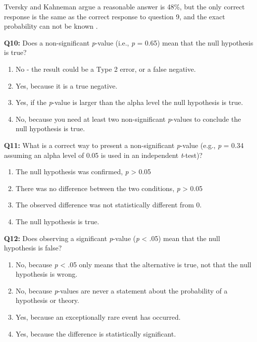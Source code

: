 \documentclass[
  oneside]{book}
\providecommand{\tightlist}{%
  \setlength{\itemsep}{0pt}\setlength{\parskip}{0pt}}
\begin{document}
Tversky and Kahneman argue a reasonable answer is 48\%, but the only correct response is the same as the correct response to question 9, and the exact probability can not be known \citep{miller_what_2009}.

\textbf{Q10:} Does a non-significant \emph{p}-value (i.e., \emph{p} = 0.65) mean that the null hypothesis is true?

\begin{enumerate}
\def\labelenumi{\Alph{enumi})}
\tightlist
\item
  No - the result could be a Type 2 error, or a false negative.
\item
  Yes, because it is a true negative.
\item
  Yes, if the \emph{p}-value is larger than the alpha level the null hypothesis is true.
\item
  No, because you need at least two non-significant \emph{p}-values to conclude the null hypothesis is true.
\end{enumerate}

\textbf{Q11:} What is a correct way to present a non-significant \emph{p}-value (e.g., \emph{p} = 0.34 assuming an alpha level of 0.05 is used in an independent \emph{t}-test)?

\begin{enumerate}
\def\labelenumi{\Alph{enumi})}
\tightlist
\item
  The null hypothesis was confirmed, \emph{p} \textgreater{} 0.05
\item
  There was no difference between the two conditions, \emph{p} \textgreater{} 0.05
\item
  The observed difference was not statistically different from 0.
\item
  The null hypothesis is true.
\end{enumerate}

\textbf{Q12:} Does observing a significant \emph{p}-value (\emph{p} \textless{} .05) mean that the null hypothesis is false?

\begin{enumerate}
\def\labelenumi{\Alph{enumi})}
\tightlist
\item
  No, because \emph{p} \textless{} .05 only means that the alternative is true, not that the null hypothesis is wrong.
\item
  No, because \emph{p}-values are never a statement about the probability of a hypothesis or theory.
\item
  Yes, because an exceptionally rare event has occurred.
\item
  Yes, because the difference is statistically significant.
\end{enumerate}
\end{document}
